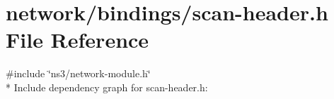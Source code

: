 \hypertarget{network_2bindings_2scan-header_8h}{}\section{network/bindings/scan-\/header.h File Reference}
\label{network_2bindings_2scan-header_8h}
{\ttfamily \#include \char`\"{}ns3/network-\/module.\+h\char`\"{}}\\*
Include dependency graph for scan-\/header.h\+:
